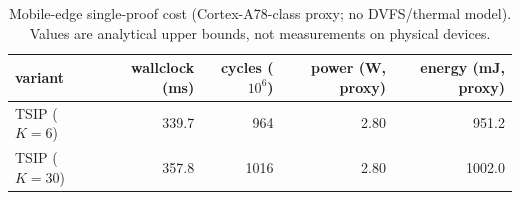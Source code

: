 \begin{table}[t]
\centering
\caption{Mobile-edge single-proof cost (Cortex-A78-class proxy; no DVFS/thermal model). Values are analytical upper bounds, not measurements on physical devices.}
\label{tab:mobile-energy}
\small
\begin{tabular}{lrrrr}
\toprule
variant & wallclock (ms) & cycles ($10^6$) & power (W, proxy) & energy (mJ, proxy) \\
\midrule
TSIP ($K{=}6$) & 339.7 & 964 & 2.80 & 951.2 \\
TSIP ($K{=}30$) & 357.8 & 1016 & 2.80 & 1002.0 \\
\bottomrule
\end{tabular}
\end{table}
